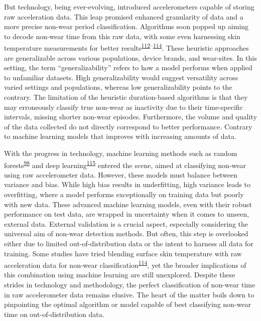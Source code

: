 \documentclass[
  10pt,
]{scrbook}
\begin{document}
But technology, being ever-evolving, introduced accelerometers capable
of storing raw acceleration data. This leap promised enhanced
granularity of data and a more precise non-wear period classification.
Algorithms soon popped up aiming to decode non-wear time from this raw
data, with some even harnessing skin temperature measurements for better
results\textsuperscript{\protect\hyperlink{ref-duncan_wear-time_2018}{112}--\protect\hyperlink{ref-zhou_classification_2015}{114}}.
These heuristic approaches are generalizable across various populations,
device brands, and wear-sites. In this setting, the term
``generalizability'' refers to how a model performs when applied to
unfamiliar datasets. High generalizability would suggest versatility
across varied settings and populations, whereas low generalizability
points to the contrary. The limitation of the heuristic duration-based
algorithms is that they may erroneously classify true non-wear as
inactivity due to their time-specific intervals, missing shorter
non-wear episodes. Furthermore, the volume and quality of the data
collected do not directly correspond to better performance. Contrary to
machine learning models that improves with increasing amounts of data.

With the progress in technology, machine learning methods such as random
forests\textsuperscript{\protect\hyperlink{ref-sundararajan_sleep_2021}{98}}
and deep
learning\textsuperscript{\protect\hyperlink{ref-syed_novel_2021}{115}}
entered the scene, aimed at classifying non-wear using raw accelerometer
data. However, these models must balance between variance and bias.
While high bias results in underfitting, high variance leads to
overfitting, where a model performs exceptionally on training data but
poorly with new data. These advanced machine learning models, even with
their robust performance on test data, are wrapped in uncertainty when
it comes to unseen, external data. External validation is a crucial
aspect, especially considering the universal aim of non-wear detection
methods. But often, this step is overlooked either due to limited
out-of-distribution data or the intent to harness all data for training.
Some studies have tried blending surface skin temperature with raw
acceleration data for non-wear
classification\textsuperscript{\protect\hyperlink{ref-zhou_classification_2015}{114}},
yet the broader implications of this combination using machine learning
are still unexplored. Despite these strides in technology and
methodology, the perfect classification of non-wear time in raw
accelerometer data remains elusive. The heart of the matter boils down
to pinpointing the optimal algorithm or model capable of best
classifying non-wear time on out-of-distribution data.
\end{document}
